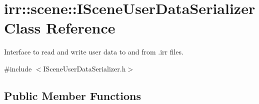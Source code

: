 \hypertarget{classirr_1_1scene_1_1ISceneUserDataSerializer}{}\section{irr\+:\+:scene\+:\+:I\+Scene\+User\+Data\+Serializer Class Reference}
\label{classirr_1_1scene_1_1ISceneUserDataSerializer}


Interface to read and write user data to and from .irr files.  




{\ttfamily \#include $<$I\+Scene\+User\+Data\+Serializer.\+h$>$}

\subsection*{Public Member Functions}
